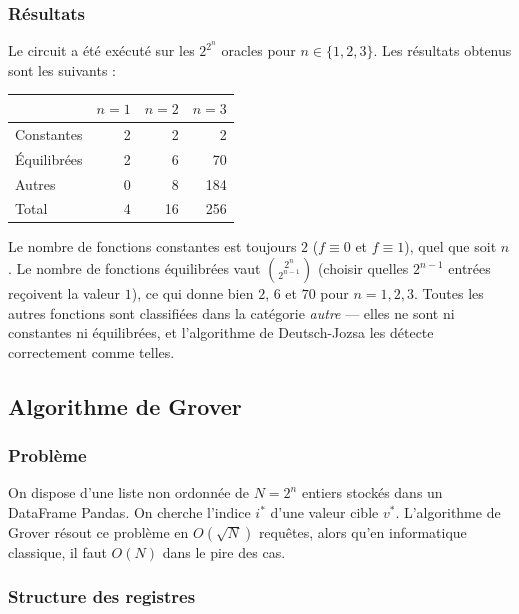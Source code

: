 \documentclass{ceri/sty/rapport}
\begin{document}
\subsubsection{Résultats}

Le circuit a été exécuté sur les $2^{2^n}$ oracles pour $n \in \{1, 2, 3\}$.
Les résultats obtenus sont les suivants :

\begin{center}
\begin{tabular}{lrrr}
\toprule
 & $n=1$ & $n=2$ & $n=3$ \\
\midrule
Constantes  & 2  & 2  & 2   \\
Équilibrées & 2  & 6  & 70  \\
Autres      & 0  & 8  & 184 \\
\midrule
Total       & 4  & 16 & 256 \\
\bottomrule
\end{tabular}
\end{center}

Le nombre de fonctions constantes est toujours $2$ ($f \equiv 0$ et $f \equiv 1$),
quel que soit $n$. Le nombre de fonctions équilibrées vaut $\binom{2^n}{2^{n-1}}$
(choisir quelles $2^{n-1}$ entrées reçoivent la valeur $1$), ce qui donne bien
$2$, $6$ et $70$ pour $n = 1, 2, 3$. Toutes les autres fonctions sont classifiées
dans la catégorie \textit{autre} — elles ne sont ni constantes ni équilibrées,
et l'algorithme de Deutsch-Jozsa les détecte correctement comme telles.

\newpage
\subsection{Algorithme de Grover}

\subsubsection{Problème}

On dispose d'une liste non ordonnée de $N = 2^n$ entiers stockés dans un
DataFrame Pandas. On cherche l'indice $i^*$ d'une valeur cible $v^*$.
L'algorithme de Grover résout ce problème en $O(\sqrt{N})$ requêtes, alors qu'en informatique classique, il faut $O(N)$ dans le pire des cas.

\subsubsection{Structure des registres}
\end{document}
